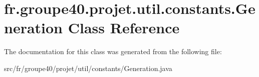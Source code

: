 \hypertarget{classfr_1_1groupe40_1_1projet_1_1util_1_1constants_1_1_generation}{}\section{fr.\+groupe40.\+projet.\+util.\+constants.\+Generation Class Reference}
\label{classfr_1_1groupe40_1_1projet_1_1util_1_1constants_1_1_generation}


The documentation for this class was generated from the following file\+:\begin{DoxyCompactItemize}
\item 
src/fr/groupe40/projet/util/constants/Generation.\+java\end{DoxyCompactItemize}

